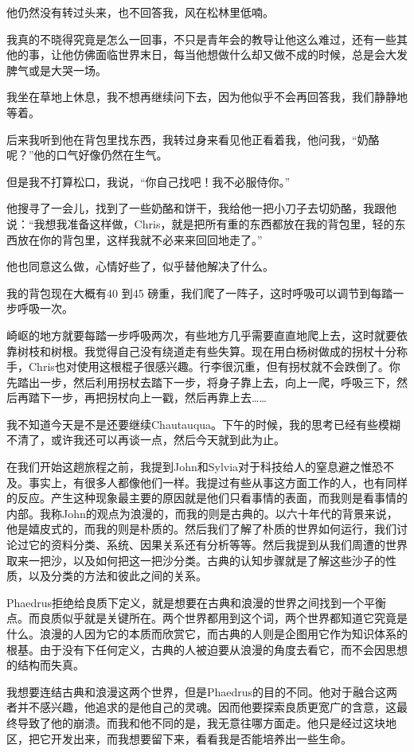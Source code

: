 \documentclass[UTF8]{article}
\begin{document}
\par 他仍然没有转过头来，也不回答我，风在松林里低喃。
\par 我真的不晓得究竟是怎么一回事，不只是青年会的教导让他这么难过，还有一些其他的事，让他仿佛面临世界末日，每当他想做什么却又做不成的时候，总是会大发脾气或是大哭一场。
\par 我坐在草地上休息，我不想再继续问下去，因为他似乎不会再回答我，我们静静地等着。
\par 后来我听到他在背包里找东西，我转过身来看见他正看着我，他问我，“奶酪呢？”他的口气好像仍然在生气。
\par 但是我不打算松口，我说，“你自己找吧！我不必服侍你。”
\par 他搜寻了一会儿，找到了一些奶酪和饼干，我给他一把小刀子去切奶酪，我跟他说：“我想我准备这样做，Chris，就是把所有重的东西都放在我的背包里，轻的东西放在你的背包里，这样我就不必来来回回地走了。”
\par 他也同意这么做，心情好些了，似乎替他解决了什么。
\par 我的背包现在大概有40 到45 磅重，我们爬了一阵子，这时呼吸可以调节到每踏一步呼吸一次。
\par 崎岖的地方就要每踏一步呼吸两次，有些地方几乎需要直直地爬上去，这时就要依靠树枝和树根。我觉得自己没有绕道走有些失算。现在用白杨树做成的拐杖十分称手，Chris也对使用这根棍子很感兴趣。行李很沉重，但有拐杖就不会跌倒了。你先踏出一步，然后利用拐杖去踏下一步，将身子靠上去，向上一爬，呼吸三下，然后再踏下一步，再把拐杖向上一戳，然后再靠上去……
\par 我不知道今天是不是还要继续Chautauqua。下午的时候，我的思考已经有些模糊不清了，或许我还可以再谈一点，然后今天就到此为止。
\par 在我们开始这趟旅程之前，我提到John和Sylvia对于科技给人的窒息避之惟恐不及。事实上，有很多人都像他们一样。我提过有些从事这方面工作的人，也有同样的反应。产生这种现象最主要的原因就是他们只看事情的表面，而我则是看事情的内部。我称John的观点为浪漫的，而我的则是古典的。以六十年代的背景来说，他是嬉皮式的，而我的则是朴质的。然后我们了解了朴质的世界如何运行，我们讨论过它的资料分类、系统、因果关系还有分析等等。然后我提到从我们周遭的世界取来一把沙，以及如何把这一把沙分类。古典的认知步骤就是了解这些沙子的性质，以及分类的方法和彼此之间的关系。
\par Phaedrus拒绝给良质下定义，就是想要在古典和浪漫的世界之间找到一个平衡点。而良质似乎就是关键所在。两个世界都用到这个词，两个世界都知道它究竟是什么。浪漫的人因为它的本质而欣赏它，而古典的人则是企图用它作为知识体系的根基。由于没有下任何定义，古典的人被迫要从浪漫的角度去看它，而不会因思想的结构而失真。
\par 我想要连结古典和浪漫这两个世界，但是Phaedrus的目的不同。他对于融合这两者并不感兴趣，他追求的是他自己的灵魂。因而他要探索良质更宽广的含意，这最终导致了他的崩溃。而我和他不同的是，我无意往哪方面走。他只是经过这块地区，把它开发出来，而我想要留下来，看看我是否能培养出一些生命。
\end{document}
